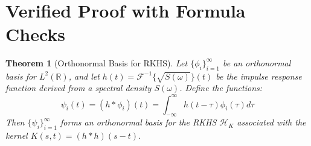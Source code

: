 \documentclass{article}
\newtheorem{theorem}{Theorem}
\begin{document}
\

\section{Verified Proof with Formula Checks}

\begin{theorem}
  [Orthonormal Basis for RKHS] Let $\{\phi_i \}_{i = 1}^{\infty}$ be an
  orthonormal basis for $L^2 (\mathbb{R})$, and let $h (t) =\mathcal{F}^{- 1}
  \{ \sqrt{S (\omega)} \} (t)$ be the impulse response function derived from a
  spectral density $S (\omega)$. Define the functions:
  \[ \psi_i (t) = (h \ast \phi_i) (t) = \int_{- \infty}^{\infty} h (t - \tau)
     \phi_i (\tau) d \tau \]
  Then $\{\psi_i \}_{i = 1}^{\infty}$ forms an orthonormal basis for the RKHS
  $\mathcal{H}_K$ associated with the kernel $K (s, t) = (h \ast h)  (s - t)$.
\end{theorem}
\end{document}
